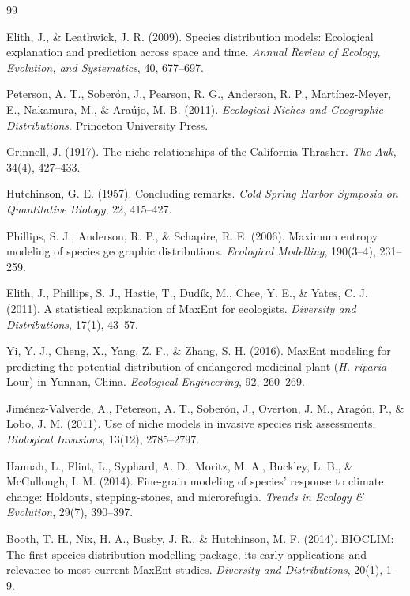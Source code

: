 \documentclass[11pt,a4paper]{article}
\begin{document}
\begin{thebibliography}{99}

Elith, J., \& Leathwick, J. R. (2009). Species distribution models: Ecological explanation and prediction across space and time. \textit{Annual Review of Ecology, Evolution, and Systematics}, 40, 677--697.

Peterson, A. T., Soberón, J., Pearson, R. G., Anderson, R. P., Martínez-Meyer, E., Nakamura, M., \& Araújo, M. B. (2011). \textit{Ecological Niches and Geographic Distributions}. Princeton University Press.

Grinnell, J. (1917). The niche-relationships of the California Thrasher. \textit{The Auk}, 34(4), 427--433.

Hutchinson, G. E. (1957). Concluding remarks. \textit{Cold Spring Harbor Symposia on Quantitative Biology}, 22, 415--427.

Phillips, S. J., Anderson, R. P., \& Schapire, R. E. (2006). Maximum entropy modeling of species geographic distributions. \textit{Ecological Modelling}, 190(3--4), 231--259.

Elith, J., Phillips, S. J., Hastie, T., Dudík, M., Chee, Y. E., \& Yates, C. J. (2011). A statistical explanation of MaxEnt for ecologists. \textit{Diversity and Distributions}, 17(1), 43--57.

Yi, Y. J., Cheng, X., Yang, Z. F., \& Zhang, S. H. (2016). MaxEnt modeling for predicting the potential distribution of endangered medicinal plant (\textit{H. riparia} Lour) in Yunnan, China. \textit{Ecological Engineering}, 92, 260--269.

Jiménez-Valverde, A., Peterson, A. T., Soberón, J., Overton, J. M., Aragón, P., \& Lobo, J. M. (2011). Use of niche models in invasive species risk assessments. \textit{Biological Invasions}, 13(12), 2785--2797.

Hannah, L., Flint, L., Syphard, A. D., Moritz, M. A., Buckley, L. B., \& McCullough, I. M. (2014). Fine-grain modeling of species' response to climate change: Holdouts, stepping-stones, and microrefugia. \textit{Trends in Ecology \& Evolution}, 29(7), 390--397.

Booth, T. H., Nix, H. A., Busby, J. R., \& Hutchinson, M. F. (2014). BIOCLIM: The first species distribution modelling package, its early applications and relevance to most current MaxEnt studies. \textit{Diversity and Distributions}, 20(1), 1--9.


\end{thebibliography}
\end{document}
